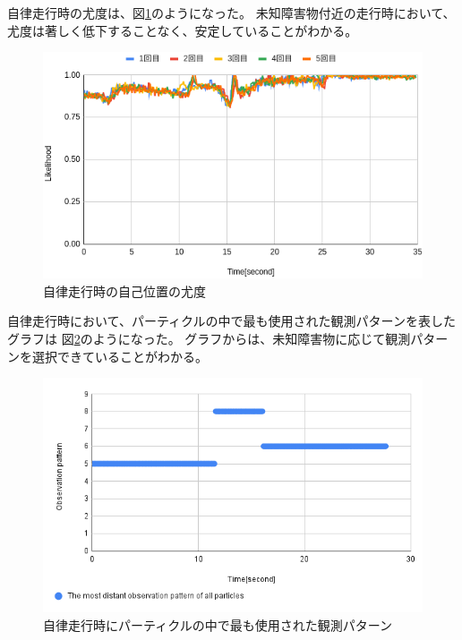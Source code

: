 自律走行時の尤度は、図\ref{fig:nav_likelihood_imp}のようになった。
未知障害物付近の走行時において、尤度は著しく低下することなく、安定していることがわかる。

\begin{figure}[H]
  \begin{center}
    \includegraphics[width=0.98\linewidth]{figs/sim_likelihood_after.png}
    \caption{自律走行時の自己位置の尤度}
    \label{fig:nav_likelihood_imp}
  \end{center}
\end{figure}

自律走行時において、パーティクルの中で最も使用された観測パターンを表したグラフは
図\ref{fig:obs_pattern_sim}のようになった。
グラフからは、未知障害物に応じて観測パターンを選択できていることがわかる。

\begin{figure}[h]
  \begin{center}
    \includegraphics[width=0.98\linewidth]{figs/sim_imp_ob_pattern.png}
    \caption{自律走行時にパーティクルの中で最も使用された観測パターン}
    \label{fig:obs_pattern_sim}
  \end{center}
\end{figure}

